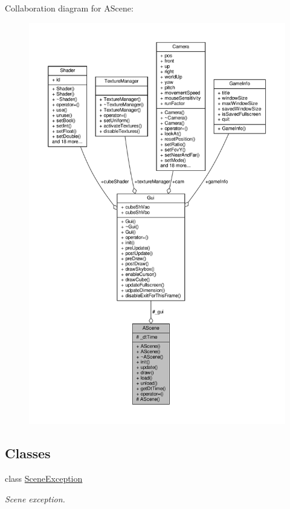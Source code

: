 Collaboration diagram for A\+Scene\+:
\nopagebreak
\begin{figure}[H]
\begin{center}
\leavevmode
\includegraphics[width=350pt]{class_a_scene__coll__graph}
\end{center}
\end{figure}
\subsection*{Classes}
\begin{DoxyCompactItemize}
\item 
class \hyperlink{class_a_scene_1_1_scene_exception}{Scene\+Exception}
\begin{DoxyCompactList}\small\item\em Scene exception. \end{DoxyCompactList}\end{DoxyCompactItemize}
